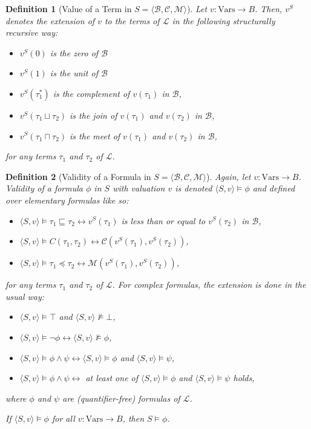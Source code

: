 \documentclass{article}
\newtheorem*{definition}{Definition}
\newcommand{\B}{\mathcal{B}}
\newcommand{\lang}{\mathcal{L}}
\newcommand{\Vars}{\text{Vars}}
\newcommand{\lcup}{\sqcup}
\newcommand{\lcap}{\sqcap}
\newcommand{\lstar}{^*}
\newcommand{\lpart}{\sqsubseteq}
\newcommand{\lcont}{C}
\newcommand{\lmeasure}{\preceq}
\begin{document}
\begin{definition}[Value of a Term in $S = \langle \B, \mathcal{C}, \mathcal{M} \rangle$]
  Let $v: \Vars \rightarrow B$. Then,  $v^S$ denotes the extension of $v$ to the terms of $\lang$ in the following structurally recursive way:
  \begin{itemize}
  \item $v^S(0)$ is the zero of $\B$
  \item $v^S(1)$ is the unit of $\B$
  \item $v^S(\tau_1 \lstar)$ is the complement of $v(\tau_1)$ in $\B$,
  \item $v^S(\tau_1 \lcup \tau_2)$ is the join of $v(\tau_1)$ and $v(\tau_2)$ in $\B$,
  \item $v^S(\tau_1 \lcap \tau_2)$ is the meet of $v(\tau_1)$ and $v(\tau_2)$ in $\B$,
  \end{itemize}
for any terms $\tau_1$ and $\tau_2$ of $\lang$.

\end{definition}

\begin{definition}[Validity of a Formula in $S = \langle \B, \mathcal{C}, \mathcal{M} \rangle$]
  Again, let $v: \Vars \rightarrow B$. Validity of a formula $\phi$ in $S$ with valuation $v$ is denoted $\langle S, v \rangle \models \phi$ and defined over elementary formulas like so:
  \begin{itemize}
  \item $\langle S, v \rangle \models \tau_1 \lpart \tau_2 \longleftrightarrow v^S(\tau_1)$ is less than or equal to $v^S(\tau_2)$ in $\B$,
  \item $\langle S, v \rangle \models \lcont(\tau_1, \tau_2) \longleftrightarrow \mathcal{C}(v^S(\tau_1), v^S(\tau_2))$,
  \item $\langle S, v \rangle \models \tau_1 \lmeasure \tau_2 \longleftrightarrow \mathcal{M}(v^S(\tau_1), v^S(\tau_2))$,
  \end{itemize}
  for any terms $\tau_1$ and $\tau_2$ of $\lang$. For complex formulas, the extension is done in the usual way:
  \begin{itemize}
  \item $\langle S, v \rangle \models \top$ and $\langle S, v \rangle \not \models \bot$,
  \item $\langle S, v \rangle \models \lnot \phi \longleftrightarrow \langle S, v \rangle \not\models \phi$,
  \item $\langle S, v \rangle \models \phi \land \psi \longleftrightarrow \langle S, v \rangle \models \phi$ and $\langle S, v \rangle \models \psi$,
  \item $\langle S, v \rangle \models \phi \land \psi \longleftrightarrow$ at least one of  $\langle S, v \rangle \models \phi$ and $\langle S, v \rangle \models \psi$ holds,
  \end{itemize}
  where $\phi$ and $\psi$ are (quantifier-free) formulas of $\lang$.

  If $\langle S, v \rangle \models \phi$ for all $v: \Vars \rightarrow B$, then $S \models \phi$.
\end{definition}
\end{document}
